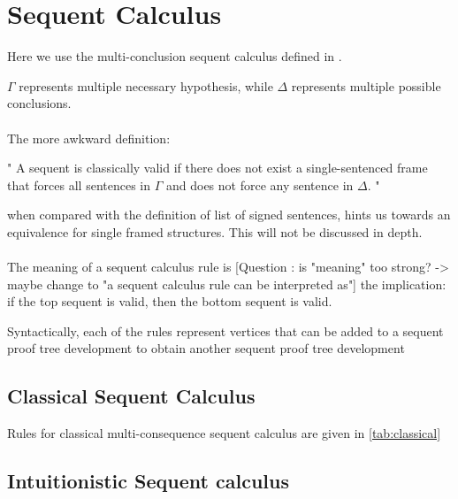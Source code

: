 \documentclass[runningheads]{llncs}
\begin{document}
\signedSentenceClassicalDefinition 
\fClassicalDefinition






\section{Sequent Calculus}
    Here we use the multi-conclusion sequent calculus defined in \cite{book2}. 

\sequentDefinition

$\Gamma $ represents multiple necessary hypothesis, while $\Delta$ represents multiple possible conclusions. 
\sequentValidityDefinition
\paragraph{}
The more awkward definition:


"
A sequent is classically valid if there does not exist a single-sentenced frame 
that forces all sentences in $\Gamma$ and does not force any sentence in $\Delta$.
"

when compared with the definition of list of signed sentences, hints us towards an equivalence for single framed structures. This will not be discussed in depth. 

\paragraph{}
The meaning of a sequent calculus rule is [Question : is "meaning" too strong? -> maybe change to "a sequent calculus rule can be interpreted as"] the implication: if the top sequent is 
 valid, then the bottom sequent is valid.
 
 Syntactically, each of the rules represent vertices that can be added to a sequent proof tree development 
to obtain another sequent proof tree development




\subsection {Classical Sequent Calculus}

\developmentSequentClassicalDefinition

Rules for classical multi-consequence sequent calculus are given in \ref{tab:classical}

\RulesClassicalSequentCalculus
\subsection {Intuitionistic Sequent calculus}
\end{document}
